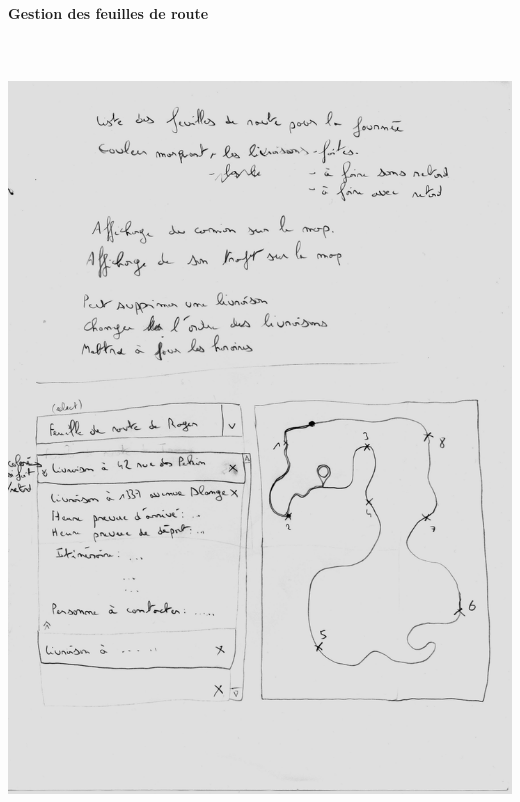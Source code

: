 \documentclass{report}
\begin{document}
\begin{appendices}
\pagebreak

\paragraph{Gestion des feuilles de route}
~~\\
~~\\
\includegraphics[scale = 0.55]{images/croquisgestion.jpg}

\pagebreak


\end{appendices}
\end{document}
